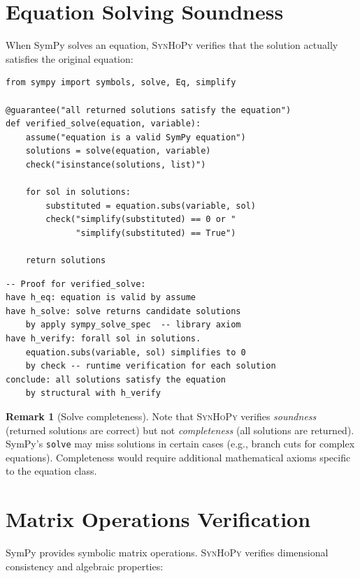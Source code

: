\documentclass[11pt,a4paper]{report}
\theoremstyle{definition}
\newtheorem{remark}[definition]{Remark}
\theoremstyle{plain}
\newcommand{\synhopy}{\textsc{SynHoPy}}
\begin{document}
\section{Equation Solving Soundness}

When SymPy solves an equation, \synhopy{} verifies that the solution
actually satisfies the original equation:

\begin{lstlisting}[style=synhopy]
from sympy import symbols, solve, Eq, simplify

@guarantee("all returned solutions satisfy the equation")
def verified_solve(equation, variable):
    assume("equation is a valid SymPy equation")
    solutions = solve(equation, variable)
    check("isinstance(solutions, list)")

    for sol in solutions:
        substituted = equation.subs(variable, sol)
        check("simplify(substituted) == 0 or "
              "simplify(substituted) == True")

    return solutions
\end{lstlisting}

\begin{lstlisting}[style=proof]
-- Proof for verified_solve:
have h_eq: equation is valid by assume
have h_solve: solve returns candidate solutions
    by apply sympy_solve_spec  -- library axiom
have h_verify: forall sol in solutions.
    equation.subs(variable, sol) simplifies to 0
    by check -- runtime verification for each solution
conclude: all solutions satisfy the equation
    by structural with h_verify
\end{lstlisting}

\begin{remark}[Solve completeness]
Note that \synhopy{} verifies \emph{soundness} (returned solutions are
correct) but not \emph{completeness} (all solutions are returned).
SymPy's \texttt{solve} may miss solutions in certain cases (e.g., branch
cuts for complex equations).  Completeness would require additional
mathematical axioms specific to the equation class.
\end{remark}

\section{Matrix Operations Verification}

SymPy provides symbolic matrix operations.  \synhopy{} verifies dimensional
consistency and algebraic properties:
\end{document}
